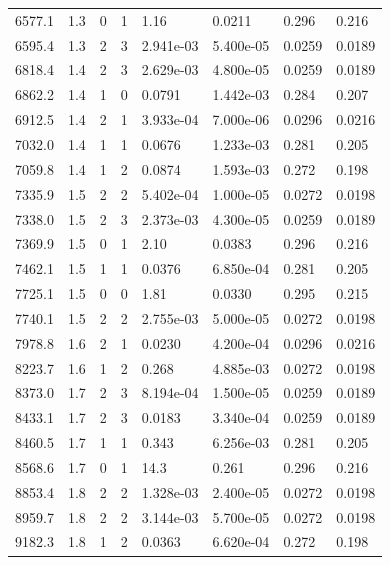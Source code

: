 \documentclass[preview]{standalone}
\begin{document}
{{{\begin{tabular}{L{1.2cm}C{1.2cm} C{0.3cm}C{0.5cm} C{1.4cm}C{1.4cm} C{1.4cm}C{1.4cm}}
  6577.1  &   1.3  & 0     &  1 &  1.16  & 0.0211  & 0.296 &  0.216   \\ 
  6595.4  &   1.3  & 2     &  3 &  2.941e-03  & 5.400e-05  & 0.0259 &  0.0189   \\ 
  6818.4  &   1.4  & 2     &  3 &  2.629e-03  & 4.800e-05  & 0.0259 &  0.0189   \\ 
  6862.2  &   1.4  & 1     &  0 &  0.0791  & 1.442e-03  & 0.284 &  0.207   \\ 
  6912.5  &   1.4  & 2     &  1 &  3.933e-04  & 7.000e-06  & 0.0296 &  0.0216   \\ 
  7032.0  &   1.4  & 1     &  1 &  0.0676  & 1.233e-03  & 0.281 &  0.205   \\ 
  7059.8  &   1.4  & 1     &  2 &  0.0874  & 1.593e-03  & 0.272 &  0.198   \\ 
  7335.9  &   1.5  & 2     &  2 &  5.402e-04  & 1.000e-05  & 0.0272 &  0.0198   \\ 
  7338.0  &   1.5  & 2     &  3 &  2.373e-03  & 4.300e-05  & 0.0259 &  0.0189   \\ 
  7369.9  &   1.5  & 0     &  1 &  2.10  & 0.0383  & 0.296 &  0.216   \\ 
  7462.1  &   1.5  & 1     &  1 &  0.0376  & 6.850e-04  & 0.281 &  0.205   \\ 
  7725.1  &   1.5  & 0     &  0 &  1.81  & 0.0330  & 0.295 &  0.215   \\ 
  7740.1  &   1.5  & 2     &  2 &  2.755e-03  & 5.000e-05  & 0.0272 &  0.0198   \\ 
  7978.8  &   1.6  & 2     &  1 &  0.0230  & 4.200e-04  & 0.0296 &  0.0216   \\ 
  8223.7  &   1.6  & 1     &  2 &  0.268  & 4.885e-03  & 0.0272 &  0.0198   \\ 
  8373.0  &   1.7  & 2     &  3 &  8.194e-04  & 1.500e-05  & 0.0259 &  0.0189   \\ 
  8433.1  &   1.7  & 2     &  3 &  0.0183  & 3.340e-04  & 0.0259 &  0.0189   \\ 
  8460.5  &   1.7  & 1     &  1 &  0.343  & 6.256e-03  & 0.281 &  0.205   \\ 
  8568.6  &   1.7  & 0     &  1 &  14.3  & 0.261  & 0.296 &  0.216   \\ 
  8853.4  &   1.8  & 2     &  2 &  1.328e-03  & 2.400e-05  & 0.0272 &  0.0198   \\ 
  8959.7  &   1.8  & 2     &  2 &  3.144e-03  & 5.700e-05  & 0.0272 &  0.0198   \\ 
  9182.3  &   1.8  & 1     &  2 &  0.0363  & 6.620e-04  & 0.272 &  0.198   \\ 

\end{tabular}}}}
\end{document}
